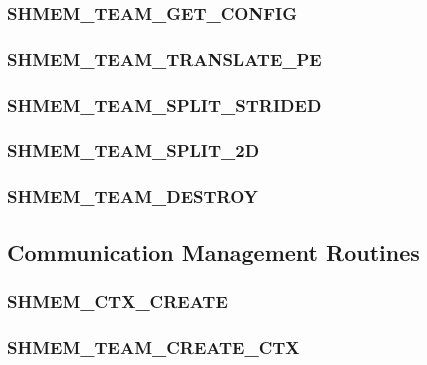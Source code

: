 \documentclass[10pt,oneside]{book}
\begin{document}
\subsubsection{\textbf{SHMEM\_TEAM\_GET\_CONFIG}}\label{subsec:shmem_team_get_config}


\subsubsection{\textbf{SHMEM\_TEAM\_TRANSLATE\_PE}}\label{subsec:shmem_team_translate_pe}


\subsubsection{\textbf{SHMEM\_TEAM\_SPLIT\_STRIDED}}\label{subsec:shmem_team_split_strided}


\subsubsection{\textbf{SHMEM\_TEAM\_SPLIT\_2D}}\label{subsec:shmem_team_split_2d}


\subsubsection{\textbf{SHMEM\_TEAM\_DESTROY}}\label{subsec:shmem_team_destroy}




\subsection{Communication Management Routines}\label{sec:ctx}


\subsubsection{\textbf{SHMEM\_CTX\_CREATE}}
\label{subsec:shmem_ctx_create}


\subsubsection{\textbf{SHMEM\_TEAM\_CREATE\_CTX}}
\label{subsec:shmem_team_create_ctx}

\end{document}
